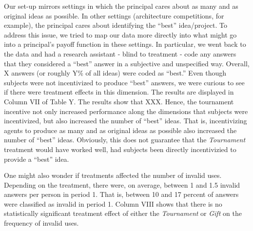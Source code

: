 Our set-up mirrors settings in which the principal cares about 
as many and as original ideas as possible. In other settings (architecture 
competitions, for example), the principal cares about identifying the ``best'' idea/project. 
To address this issue, we tried to map our data more directly into what might go into a 
principal’s payoff function in these settings. In particular, we went back to the data and had a research assistant
 - blind to treatment - code any answers that they considered a ``best'' answer in a subjective and unspecified way. 
Overall, X answers (or roughly Y\% of all ideas) were coded as ``best.'' Even though subjects 
were not incentivized to produce ``best'' answers, we were curious to see if there were treatment 
effects in this dimension. The results are displayed in Column VII of Table Y. The results show that XXX. 
Hence, the tournament incentive not only increased performance along the dimensions 
that subjects were incentivized, but also increased the number of ``best'' ideas. 
That is, incentivizing agents to produce as many and as original ideas as possible also increased
 the number of  “best” ideas. 
Obviously, this does not guarantee that the \textit{Tournament} treatment would have worked well,
had subjects been directly incentivizied to provide a ``best'' idea. 

One might also wonder if treatments affected the number of invalid uses. 
Depending on the treatment, there were, on average, between 1 and 1.5 invalid 
answers per person in period 1. That is, between 10 and 17 percent of answers
were classified as invalid in period 1. Column VIII shows that there is no statistically significant 
treatment effect of either the \textit{Tournament} or \textit{Gift} on the frequency of invalid uses. 




